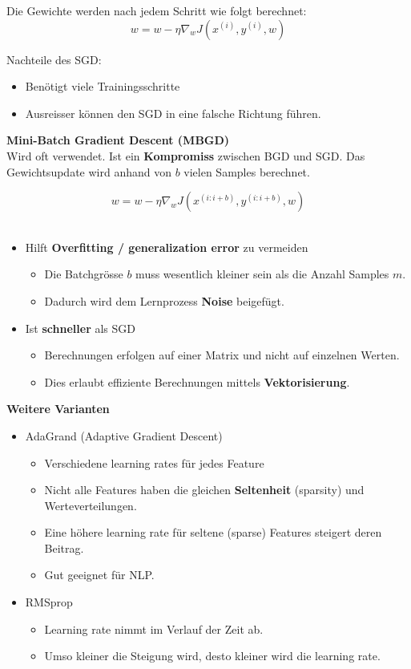 Die Gewichte werden nach jedem Schritt wie folgt berechnet:
$$ w = w - \eta \nabla_{w} J(x^{(i)}, y^{(i)}, w) $$


Nachteile des SGD:

\begin{itemize}
	\item Benötigt viele Trainingsschritte
	\item Ausreisser können den SGD in eine falsche Richtung führen.
\end{itemize}


\newpage
\textbf{Mini-Batch Gradient Descent (MBGD)} \\

Wird oft verwendet. Ist ein \textbf{Kompromiss} zwischen BGD und SGD.
Das Gewichtsupdate wird anhand von $b$ vielen Samples berechnet.

$$ w = w - \eta \nabla_{w} J(x^{(i:i+b)}, y^{(i:i+b)}, w) $$ \\


\begin{itemize}
	\item Hilft \textbf{Overfitting / generalization error} zu vermeiden
	\begin{itemize}
		\item Die Batchgrösse $b$ muss wesentlich kleiner sein als die Anzahl Samples $m$.
		\item Dadurch wird dem Lernprozess \textbf{Noise} beigefügt.
	\end{itemize}
	\item Ist \textbf{schneller} als SGD
	\begin{itemize}
		\item Berechnungen erfolgen auf einer Matrix und nicht auf einzelnen Werten.
		\item Dies erlaubt effiziente Berechnungen mittels \textbf{Vektorisierung}.
	\end{itemize}
\end{itemize}


\textbf{Weitere Varianten} \\

\begin{itemize}
	\item AdaGrand (Adaptive Gradient Descent)
	\begin{itemize}
		\item Verschiedene learning rates für jedes Feature
		\item Nicht alle Features haben die gleichen \textbf{Seltenheit} (sparsity) und Werteverteilungen.
		\item Eine höhere learning rate für seltene (sparse) Features steigert deren Beitrag.
		\item Gut geeignet für NLP.
	\end{itemize}
	\item RMSprop
	\begin{itemize}
		\item Learning rate nimmt im Verlauf der Zeit ab.
		\item Umso kleiner die Steigung wird, desto kleiner wird die learning rate.
	\end{itemize}
\end{itemize}





